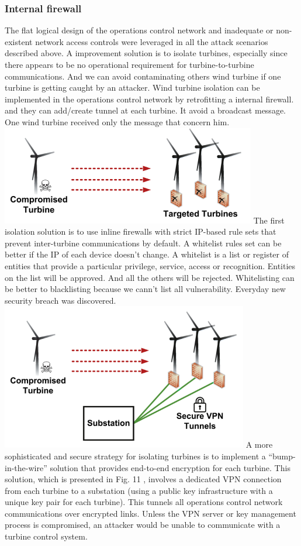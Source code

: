 \documentclass[twosided,a4,10pt]{article}
\begin{document}
\begin{multicols}{2}
\subsubsection{Internal firewall}
The flat logical design of the operations control network and inadequate or non-existent network access controls were leveraged in all the attack scenarios described above. A improvement solution is to isolate turbines, especially since there appears to be no operational requirement for turbine-to-turbine communications. And we can avoid contaminating  others wind turbine if one turbine is getting caught by an attacker. Wind turbine isolation can be implemented in the operations control network by retrofitting a internal firewall. and they can add/create tunnel at each turbine. It avoid a broadcast message. One wind turbine received only the message that concern him. 
\includegraphics[scale=0.8]{internalfirewall}
\newline
The first isolation solution is to use inline firewalls with strict IP-based rule sets that prevent inter-turbine communications by default. A whitelist rules set can be better if the IP of each device doesn't change. A whitelist is a list or register of entities that provide a particular privilege, service, access or recognition. Entities on the list will be approved. And all the others will be rejected. Whitelisting can be better to blacklisting because we cann't list all vulnerability. Everyday new security breach was discovered.
\includegraphics[scale=0.85]{vpn}
\newline
A more sophisticated and secure strategy for isolating turbines is to implement a “bump-in-the-wire” solution that provides end-to-end encryption for each turbine. This solution, which is presented in Fig. 11 , involves a dedicated VPN connection from each turbine to a substation (using a public key infrastructure with a unique key pair 
for each turbine). This tunnels all operations control network communications over encrypted links. Unless the VPN server or key management process is compromised, an attacker would be unable to communicate with a turbine control system. 



\end{multicols}
\end{document}
